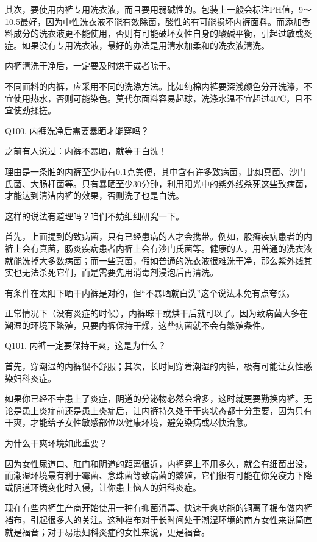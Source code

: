 \documentclass[12pt,UTF8]{ctexbook}
\begin{document}
其次，要使用内裤专用洗衣液，而且要用弱碱性的。包装上一般会标注PH值，9～10.5最好，因为中性洗衣液不能有效除菌，酸性的有可能损坏内裤面料。而添加香料成分的洗衣液更不能使用，否则有可能破坏女性自身的酸碱平衡，引起过敏或炎症。如果没有专用洗衣液，最好的办法是用清水加柔和的洗衣液清洗。


内裤清洗干净后，一定要及时烘干或者晾干。

不同面料的内裤，应采用不同的洗涤方法。比如纯棉内裤要深浅颜色分开洗涤，不宜使用热水，否则可能染色。莫代尔面料容易起球，洗涤水温不宜超过40℃，且不宜使劲揉搓。





Q100. 内裤洗净后需要暴晒才能穿吗？


之前有人说过：内裤不暴晒，就等于白洗！

理由是一条脏的内裤至少带有0.1克粪便，其中含有许多致病菌，比如真菌、沙门氏菌、大肠杆菌等。只有暴晒至少30分钟，利用阳光中的紫外线杀死这些致病菌，才能达到清洁内裤的效果，否则洗了也是白洗。

这样的说法有道理吗？咱们不妨细细研究一下。

首先，上面提到的致病菌，只有已经患病的人才会携带。例如，股癣疾病患者的内裤上会有真菌，肠炎疾病患者内裤上会有沙门氏菌等。健康的人，用普通的洗衣液就能洗掉大多数病菌；而一些真菌，假如普通的洗衣液很难洗干净，那么紫外线其实也无法杀死它们，而是需要先用消毒剂浸泡后再清洗。

有条件在太阳下晒干内裤是对的，但“不暴晒就白洗”这个说法未免有点夸张。

正常情况下（没有炎症的时候），内裤晾干或烘干后就可以了。因为致病菌大多在潮湿的环境下繁殖，只要内裤保持干燥，这些病菌就不会有繁殖条件。





Q101. 内裤一定要保持干爽，这是为什么？


首先，穿潮湿的内裤很不舒服；其次，长时间穿着潮湿的内裤，极有可能让女性感染妇科炎症。


如果你已经不幸患上了炎症，阴道的分泌物必然会增多，这时就更要勤换内裤。无论是患上炎症前还是患上炎症后，让内裤持久处于干爽状态都十分重要，因为只有干爽，才能给予女性敏感部位以健康环境，避免染病或尽快治愈。


为什么干爽环境如此重要？

因为女性尿道口、肛门和阴道的距离很近，内裤穿上不用多久，就会有细菌出没，而潮湿环境最有利于霉菌、念珠菌等致病菌的繁殖，它们很有可能在你免疫力下降或阴道环境变化时入侵，让你患上恼人的妇科炎症。

现在有些内裤生产商开始使用一种有抑菌消毒、快速干爽功能的铜离子棉布做内裤裆布，引起很多人的关注。这种裆布对于长时间处于潮湿环境的南方女性来说简直就是福音；对于易患妇科炎症的女性来说，更是福音。
\end{document}
